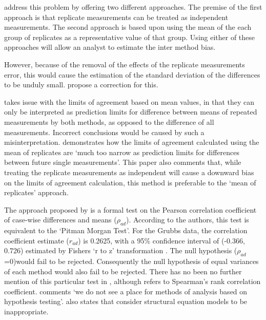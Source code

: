 \documentclass[MAIN.tex]{subfiles}
\begin{document}
	\citet*{BA86} address this problem by offering two different
	approaches. The premise of the first approach is that replicate
	measurements can be treated as independent measurements. The
	second approach is based upon using the mean of the each group of
	replicates as a representative value of that group. Using either
	of these approaches will allow an analyst to estimate the inter
	method bias.
	
	
	However, because of the removal of the effects of the replicate
	measurements error, this would cause the estimation of the
	standard deviation of the differences to be unduly small.
	\citet*{BA86} propose a correction for this.
	
	\citet{BXC2008} takes issue with the limits of agreement based on
	mean values, in that they can only be interpreted as prediction
	limits for difference between means of repeated measurements by
	both methods, as opposed to the difference of all measurements.
	Incorrect conclusions would be caused by such a misinterpretation.
	\citet{BXC2008} demonstrates how the limits of agreement
	calculated using the mean of replicates are `much too narrow as
	prediction limits for differences between future single
	measurements'. This paper also comments that, while treating the
	replicate measurements as independent will cause a downward bias
	on the limits of agreement calculation, this method is preferable
	to the `mean of replicates' approach.
	
	The approach proposed by \citet{BA83} is a formal test on the
	Pearson correlation coefficient of case-wise differences and means
	($\rho_{ad}$). According to the authors, this test is equivalent
	to the `Pitman Morgan Test'. For the Grubbs data, the correlation
	coefficient estimate ($r_{ad}$) is 0.2625, with a 95\% confidence
	interval of (-0.366, 0.726) estimated by Fishers `r to z'
	transformation \citep*{Cohen}. The null hypothesis ($\rho_{ad}$
	=0)would fail to be rejected. Consequently the null hypothesis of
	equal variances of each method would also fail to be rejected.
	There has no been no further mention of this particular test in
	\citet{BA86}, although \citet{BA99} refers to Spearman's rank
	correlation coefficient. \citet{BA99} comments `we do not see a
	place for methods of analysis based on hypothesis testing'.
	\citet{BA99} also states that consider structural equation models
	to be inappropriate.
	
\end{document}
